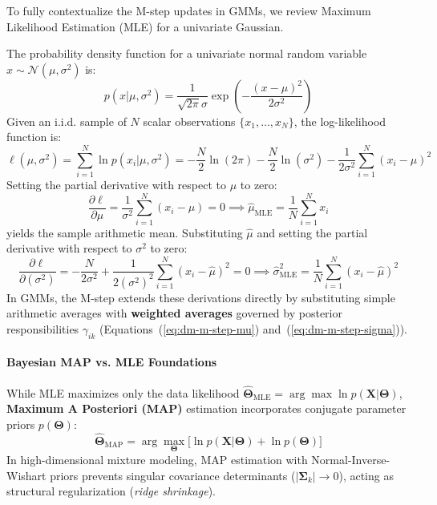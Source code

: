 To fully contextualize the M-step updates in GMMs, we review Maximum Likelihood Estimation (MLE) for a univariate Gaussian.

The probability density function for a univariate normal random variable $x \sim \mathcal{N}(\mu, \sigma^2)$ is:
\begin{equation}
\label{eq:dm-1d-gaussian-pdf}
p(x | \mu, \sigma^2) = \frac{1}{\sqrt{2\pi}\sigma} \exp\left( -\frac{(x - \mu)^2}{2\sigma^2} \right)
\end{equation}
Given an i.i.d. sample of $N$ scalar observations $\{x_1, \dots, x_N\}$, the log-likelihood function is:
\begin{equation}
\label{eq:dm-1d-gaussian-loglik}
\ell(\mu, \sigma^2) = \sum_{i=1}^N \ln p(x_i | \mu, \sigma^2) = -\frac{N}{2} \ln(2\pi) - \frac{N}{2} \ln(\sigma^2) - \frac{1}{2\sigma^2} \sum_{i=1}^N (x_i - \mu)^2
\end{equation}
Setting the partial derivative with respect to $\mu$ to zero:
\begin{equation}
\frac{\partial \ell}{\partial \mu} = \frac{1}{\sigma^2} \sum_{i=1}^N (x_i - \mu) = 0 \implies \hat{\mu}_{\text{MLE}} = \frac{1}{N} \sum_{i=1}^N x_i
\end{equation}
yields the sample arithmetic mean. Substituting $\hat{\mu}$ and setting the partial derivative with respect to $\sigma^2$ to zero:
\begin{equation}
\frac{\partial \ell}{\partial (\sigma^2)} = -\frac{N}{2\sigma^2} + \frac{1}{2(\sigma^2)^2} \sum_{i=1}^N (x_i - \hat{\mu})^2 = 0 \implies \hat{\sigma}^2_{\text{MLE}} = \frac{1}{N} \sum_{i=1}^N (x_i - \hat{\mu})^2
\end{equation}
In GMMs, the M-step extends these derivations directly by substituting simple arithmetic averages with \textbf{weighted averages} governed by posterior responsibilities $\gamma_{ik}$ (Equations~(\ref{eq:dm-m-step-mu}) and~(\ref{eq:dm-m-step-sigma})).

\paragraph{Bayesian MAP vs. MLE Foundations}
While MLE maximizes only the data likelihood $\hat{\boldsymbol{\Theta}}_{\text{MLE}} = \arg\max \ln p(\mathbf{X}|\boldsymbol{\Theta})$, \textbf{Maximum A Posteriori (MAP)} estimation incorporates conjugate parameter priors $p(\boldsymbol{\Theta})$:
\begin{equation}
\hat{\boldsymbol{\Theta}}_{\text{MAP}} = \arg\max_{\boldsymbol{\Theta}} \big[ \ln p(\mathbf{X}|\boldsymbol{\Theta}) + \ln p(\boldsymbol{\Theta}) \big]
\end{equation}
In high-dimensional mixture modeling, MAP estimation with Normal-Inverse-Wishart priors prevents singular covariance determinants ($|\boldsymbol{\Sigma}_k| \to 0$), acting as structural regularization (\textit{ridge shrinkage}).

